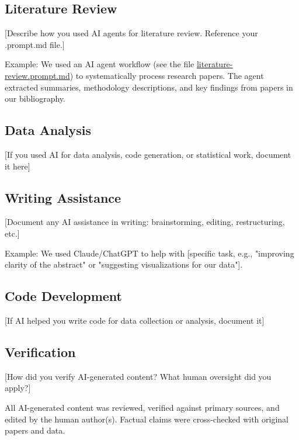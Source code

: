 
\subsection{Literature Review}

[Describe how you used AI agents for literature review. Reference your .prompt.md file.]

Example: We used an AI agent workflow (see the file \href{}{literature-review.prompt.md}) to systematically process research papers. The agent extracted summaries, methodology descriptions, and key findings from papers in our bibliography.

\subsection{Data Analysis}

[If you used AI for data analysis, code generation, or statistical work, document it here]

\subsection{Writing Assistance}

[Document any AI assistance in writing: brainstorming, editing, restructuring, etc.]

Example: We used Claude/ChatGPT to help with [specific task, e.g., "improving clarity of the abstract" or "suggesting visualizations for our data"].

\subsection{Code Development}

[If AI helped you write code for data collection or analysis, document it]

\subsection{Verification}

[How did you verify AI-generated content? What human oversight did you apply?]

All AI-generated content was reviewed, verified against primary sources, and edited by the human author(s). Factual claims were cross-checked with original papers and data.

